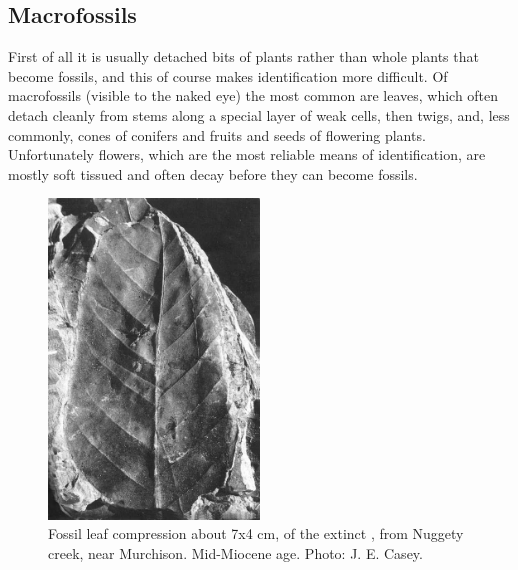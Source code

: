 \subsection{Macrofossils}

First of all it is usually detached bits of plants rather than whole plants that become fossils, and this of course makes identification more difficult.
Of macrofossils (visible to the naked eye) the most common are leaves, which often detach cleanly from stems along a special layer of weak cells, then twigs, and, less commonly, cones of conifers and fruits and seeds of flowering plants.
Unfortunately flowers, which are the most reliable means of identification, are mostly soft tissued and often decay before they can become fossils.

\begin{figure}
	\includegraphics[width=0.5\textwidth]{graphics/figure121fossil-leaf.jpg}
	\centering
	\caption[Fossil leaf compression]{Fossil leaf compression about 7x4 cm, of the extinct , from Nuggety creek, near Murchison.
    Mid-Miocene age.
	Photo: J. E. Casey.}
	\label{fig:121fossil-leaf}
\end{figure}

